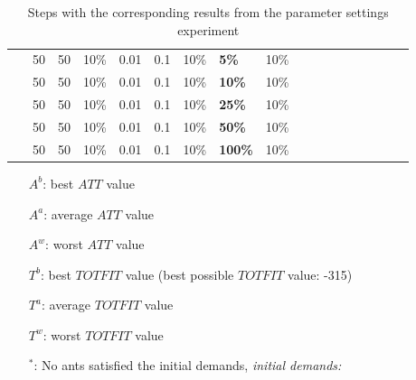 \begin{table}
\begin{tabular}{|l|l|l|l|l|l|l|l|l||l|l|l|l|l|l|}
    ~ & 50 & 50 & 10\% & 0.01 & 0.1 & 10\% & \textbf{5\%} & 10\% & ~ & ~ & ~ & ~ & ~ & ~ \\
    ~ & 50 & 50 & 10\% & 0.01 & 0.1 & 10\% & \textbf{10\%} & 10\% & ~ & ~ & ~ & ~ & ~ & ~ \\
    ~ & 50 & 50 & 10\% & 0.01 & 0.1 & 10\% & \textbf{25\%} & 10\% & ~ & ~ & ~ & ~ & ~ & ~ \\
    ~ & 50 & 50 & 10\% & 0.01 & 0.1 & 10\% & \textbf{50\%} & 10\% & ~ & ~ & ~ & ~ & ~ & ~ \\
    ~ & 50 & 50 & 10\% & 0.01 & 0.1 & 10\% & \textbf{100\%} & 10\% & ~ & ~ & ~ & ~ & ~ & ~ \\
    \hline
    \end{tabular}
    \caption {Steps with the corresponding results from the parameter settings experiment} 
    \begin{itemize}[noitemsep]
    \item[$A^b$:] best $ATT$ value
    \item[$A^a$:] average $ATT$ value
    \item[$A^w$:] worst $ATT$ value
    \item[$T^b$:] best $TOTFIT$ value (best possible $TOTFIT$ value: -315)
    \item[$T^a$:] average $TOTFIT$ value
    \item[$T^w$:] worst $TOTFIT$ value
    \item[$^*$:] No ants satisfied the initial demands, \emph{\color{red} initial demands: }
    \end{itemize}
    \label{table:parameterSettings}
\end{table}

